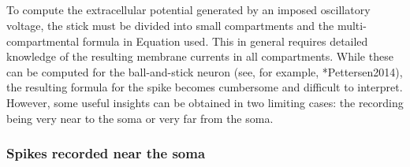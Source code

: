 \subsection{}
\label{sec:Spikes:approximate}

To compute the extracellular potential generated by an imposed oscillatory voltage,  the stick must be divided into small compartments  and the multi-compartmental formula in Equation  used. This in general requires detailed knowledge of the resulting membrane currents in all compartments. 
While these can be computed for the ball-and-stick neuron (see, for example, \citeasnoun**{Pettersen2014}), 
the resulting formula for the spike becomes cumbersome and difficult to interpret.  However, some useful insights can be obtained in two limiting cases: the recording being very near to the soma or very far from the soma.


%

\subsubsection{Spikes recorded near the soma}
\label{sec:Spikes:near-spikes}

